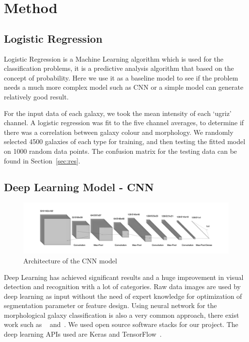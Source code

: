 \section{Method}
\label{sec:method}
\subsection{Logistic Regression}
\label{sec:log}
Logistic Regression is a Machine Learning algorithm which is used for the classification problems, it is a predictive analysis algorithm that based on the concept of probability. Here we use it as a baseline model to see if the problem needs a much more complex model such as CNN or a simple model can generate relatively good result. 

For the input data of each galaxy, we took the mean intensity of each `ugriz' channel. A logistic regression was fit to the five channel averages, to determine if there was a correlation between galaxy colour and morphology. We randomly selected 4500 galaxies of each type for training, and then testing the fitted model on 1000 random data points. The confusion matrix for the testing data can be found in Section~\ref{sec:res}.

\subsection{Deep Learning Model - CNN}
\label{sec:cnn}
\begin{figure}[h]
	\centering
	\captionsetup{justification=centering}
	\includegraphics[width=\columnwidth]{Figures/CNNArchitecture.jpg}
	\caption{Architecture of the CNN model}
	\label{fig:cnnarch}
\end{figure}

Deep Learning has achieved significant results and a huge improvement in visual detection and recognition with a lot of categories. Raw data images are used by deep learning as input without the need of expert knowledge for optimization of segmentation parameter or feature design. Using neural network for the morphological galaxy classification is also a very common approach, there exist work such as ~\cite{banerji2010galaxy} and~\cite{khan2019deep}. 
We used open source software stacks for our project. The deep learning APIs used are Keras and TensorFlow~\cite{tensorflow}. 

